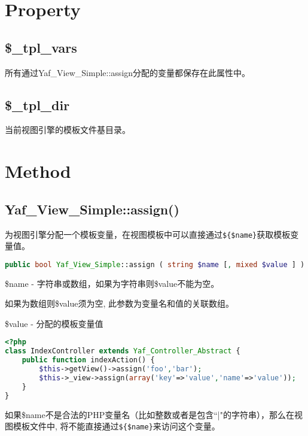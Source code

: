 \section{Property}


\subsection{\$\_tpl\_vars}


所有通过Yaf\_View\_Simple::assign分配的变量都保存在此属性中。


\subsection{\$\_tpl\_dir}

当前视图引擎的模板文件基目录。


\section{Method}


\subsection{Yaf\_View\_Simple::assign()}

为视图引擎分配一个模板变量，在视图模板中可以直接通过\texttt{\$\{\$name\}}获取模板变量值。

\begin{lstlisting}[language=PHP]
public bool Yaf_View_Simple::assign ( string $name [, mixed $value ] )
\end{lstlisting}

\begin{compactitem}
\item \$name - 字符串或数组，如果为字符串则\$value不能为空。

如果为数组则\$value须为空, 此参数为变量名和值的关联数组。

\item \$value - 分配的模板变量值
\end{compactitem}



\begin{lstlisting}[language=PHP]
<?php
class IndexController extends Yaf_Controller_Abstract {
    public function indexAction() {
        $this->getView()->assign('foo','bar');
        $this->_view->assign(array('key'=>'value','name'=>'value'));
    }
}
\end{lstlisting}

如果\$name不是合法的PHP变量名（比如整数或者是包含``|"的字符串），那么在视图模板文件中, 将不能直接通过\texttt{\$\{\$name\}}来访问这个变量。

